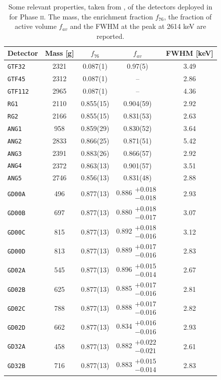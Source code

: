 \begin{table}
	\centering
	\caption{Some relevant properties, taken from \cite{GSTR-13-009,GSTR-16-002}, of the detectors deployed in {\gerda} for Phase \textsc{ii}. The mass, the enrichment fraction $f_{76}$, the fraction of active volume $f_{av}$ and the FWHM at the  peak at 2614 keV are reported.}\label{tab:gedet1}
		{\renewcommand{\arraystretch}{1.3}
	\begin{tabular}{lcccc}
		\toprule
		Detector		&	Mass [g]	&	$f_{76}$	&	$f_{av}$	&	FWHM [keV] \\
		\midrule
		\texttt{GTF32}	&	2321	&	0.087(1)	&	0.97(5)		&	3.49	\\
		\texttt{GTF45}	&	2312	&	0.087(1)	&	--			&	2.86	\\
		\texttt{GTF112}	&	2965	&	0.087(1)	&	--			&	4.36	\\
		\texttt{RG1}	&	2110	&	0.855(15)	&	0.904(59)	&	2.92	\\
		\texttt{RG2}	&	2166	&	0.855(15)	&	0.831(53)	&	2.63	\\
		\texttt{ANG1}	&	958 	&	0.859(29)	&	0.830(52)	&	3.64	\\
		\texttt{ANG2}	&	2833	&	0.866(25)	&	0.871(51)	&	5.42	\\
		\texttt{ANG3}	&	2391	&	0.883(26)	&	0.866(57)	&	2.92	\\
		\texttt{ANG4}	&	2372	&	0.863(13)	&	0.901(57)	&	3.51	\\
		\texttt{ANG5}	&	2746	&	0.856(13)	&	0.831(48)	&	2.88	\\
		\texttt{GD00A}	&	496 	&	0.877(13)	&	0.886$\substack{+0.018\\-0.018}$	&	2.93	\\
		\texttt{GD00B}	&	697 	&	0.877(13)	&	0.880$\substack{+0.018\\-0.017}$	&	3.07	\\
		\texttt{GD00C}	&	815 	&	0.877(13)	&	0.892$\substack{+0.018\\-0.016}$	&	3.12	\\
		\texttt{GD00D}	&	813 	&	0.877(13)	&	0.889$\substack{+0.017\\-0.016}$	&	2.83	\\
		\texttt{GD02A}	&	545 	&	0.877(13)	&	0.896$\substack{+0.015\\-0.014}$	&	2.67	\\
		\texttt{GD02B}	&	625 	&	0.877(13)	&	0.885$\substack{+0.017\\-0.016}$	&	2.81	\\
		\texttt{GD02C}	&	788 	&	0.877(13)	&	0.888$\substack{+0.017\\-0.016}$	&	2.82	\\
		\texttt{GD02D}	&	662 	&	0.877(13)	&	0.834$\substack{+0.016\\-0.016}$	&	2.93	\\
		\texttt{GD32A}	&	458 	&	0.877(13)	&	0.882$\substack{+0.022\\-0.021}$	&	2.61	\\
		\texttt{GD32B}	&	716 	&	0.877(13)	&	0.883$\substack{+0.015\\-0.014}$	&	2.83	\\
		\bottomrule
	\end{tabular}
}
\end{table}
